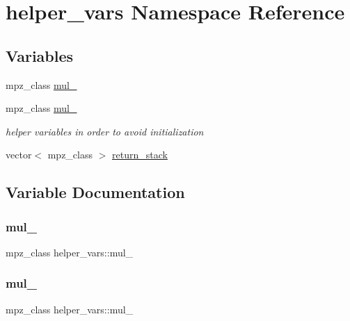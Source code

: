 \hypertarget{namespacehelper__vars}{}\section{helper\+\_\+vars Namespace Reference}
\label{namespacehelper__vars}
\subsection*{Variables}
\begin{DoxyCompactItemize}
\item 
mpz\+\_\+class \hyperlink{namespacehelper__vars_af190146bcb041e9501bb622fd0a70e1e}{mul\+\_}
\item 
mpz\+\_\+class \hyperlink{namespacehelper__vars_a3ef4720a3a8f70853c651c0bba5107b2}{mul\+\_}
\begin{DoxyCompactList}\small\item\em helper variables in order to avoid initialization \end{DoxyCompactList}\item 
vector$<$ mpz\+\_\+class $>$ \hyperlink{namespacehelper__vars_a6d2100c373830cacd232319a9958652d}{return\+\_\+stack}
\end{DoxyCompactItemize}


\subsection{Variable Documentation}
\mbox{\label{namespacehelper__vars_af190146bcb041e9501bb622fd0a70e1e}} 
\subsubsection{\texorpdfstring{mul\+\_}{mul\_1}}
{\footnotesize\ttfamily mpz\+\_\+class helper\+\_\+vars\+::mul\+\_}

\mbox{\label{namespacehelper__vars_a3ef4720a3a8f70853c651c0bba5107b2}} 
\subsubsection{\texorpdfstring{mul\+\_}{mul\_2}}
{\footnotesize\ttfamily mpz\+\_\+class helper\+\_\+vars\+::mul\+\_}



